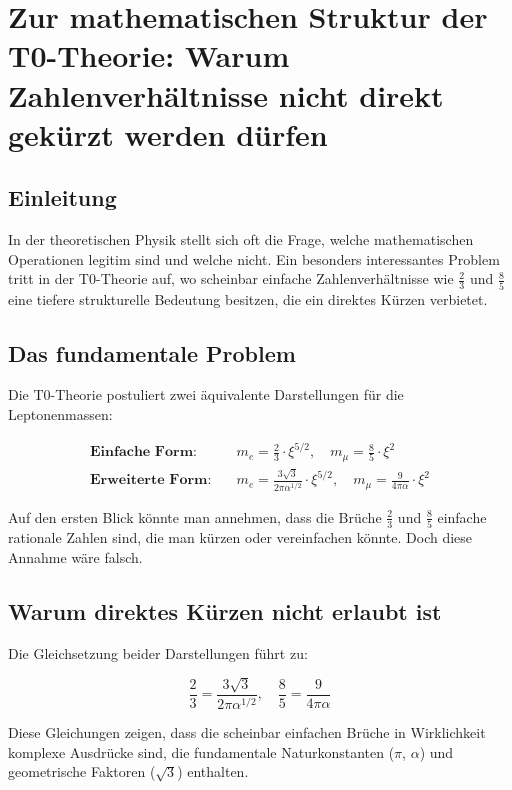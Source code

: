 \section*{Zur mathematischen Struktur der T0-Theorie: Warum Zahlenverhältnisse nicht direkt gekürzt werden dürfen}
	
	\subsection*{Einleitung}
	
	In der theoretischen Physik stellt sich oft die Frage, welche mathematischen Operationen legitim sind und welche nicht. Ein besonders interessantes Problem tritt in der T0-Theorie auf, wo scheinbar einfache Zahlenverhältnisse wie $\frac{2}{3}$ und $\frac{8}{5}$ eine tiefere strukturelle Bedeutung besitzen, die ein direktes Kürzen verbietet.
	
	\subsection*{Das fundamentale Problem}
	
	Die T0-Theorie postuliert zwei äquivalente Darstellungen für die Leptonenmassen:
	
	\begin{align*}
		\textbf{Einfache Form:} &\quad m_e = \frac{2}{3} \cdot \xi^{5/2}, \quad m_\mu = \frac{8}{5} \cdot \xi^2 \\
		\textbf{Erweiterte Form:} &\quad m_e = \frac{3\sqrt{3}}{2\pi\alpha^{1/2}} \cdot \xi^{5/2}, \quad m_\mu = \frac{9}{4\pi\alpha} \cdot \xi^2
	\end{align*}
	
	Auf den ersten Blick könnte man annehmen, dass die Brüche $\frac{2}{3}$ und $\frac{8}{5}$ einfache rationale Zahlen sind, die man kürzen oder vereinfachen könnte. Doch diese Annahme wäre falsch.
	
	\subsection*{Warum direktes Kürzen nicht erlaubt ist}
	
	Die Gleichsetzung beider Darstellungen führt zu:
	
	\[
	\frac{2}{3} = \frac{3\sqrt{3}}{2\pi\alpha^{1/2}}, \quad \frac{8}{5} = \frac{9}{4\pi\alpha}
	\]
	
	Diese Gleichungen zeigen, dass die scheinbar einfachen Brüche in Wirklichkeit komplexe Ausdrücke sind, die fundamentale Naturkonstanten ($\pi$, $\alpha$) und geometrische Faktoren ($\sqrt{3}$) enthalten.
	
